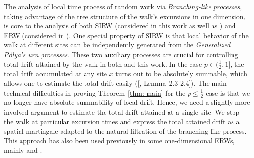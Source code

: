 \documentclass[twoside,12pt,a4paper]{article}
\numberwithin{equation}{section}
\begin{document}
	
	
	
	
	
	The analysis of local time process of random work via \textit{Branching-like processes}, taking advantage of the tree structure of the walk's excursions in one dimension, is core to the analysis of both SIRW (considered in this work as well as \cite{T96, KMP22}) and ERW (considered in \cite{DK12, KP16, KMP22b}). 
	One special property of SIRW is that local behavior of the walk at different sites can be independently generated from the \textit{Generalized P\'olya's urn processes}.
	These two auxiliary processes are crucial for controlling total drift attained by the walk in both \cite{KMP22} and this work.
	In the case $p \in (\frac{1}{2}, 1]$, the total drift accumulated at any site $x$ turns out to be absolutely summable, which allows one to estimate the total drift easily ([\cite{KMP22}, Lemma~2.3-2.4]).
	The main technical difficulties in proving Theorem~\ref{thm: main} for the $p \le \frac{1}{2}$ case is that we no longer have absolute summability of local drift.
	Hence, we need a slightly more involved argument to estimate the total drift attained at a single site.
	We stop the walk at particular excursion times and express the total attained drift as a spatial martingale adapted to the natural filtration of the branching-like process.
	This approach has also been used previously in some one-dimensional ERWs, mainly \cite{DK12} and \cite{KP16}.
	
\end{document}

